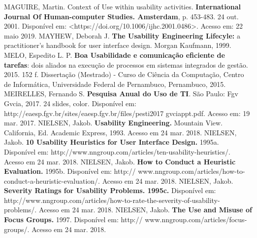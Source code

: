 \newline
\noindent
MAGUIRE, Martin. Context of Use within usability activities. \textbf{International Journal Of Human-computer Studies. Amsterdam}, p. 453-483. 24 out. 2001. Disponível em: <https://doi.org/10.1006/ijhc.2001.0486>. Acesso em: 22 maio 2019.
\newline
\newline
\noindent
MAYHEW, Deborah J. \textbf{The Usability Engineering Lifecyle:} a practitioner's handbook for user interface design. Morgan Kaufmann, 1999.
\newline
\newline
\noindent
MELO, Espedito L. P. \textbf{Boa Usabilidade e comunicação eficiente de tarefas}: dois aliados na execução de processos em sistemas integrados de gestão. 2015. 152 f. Dissertação (Mestrado) - Curso de Ciência da Computação, Centro de Informática, Universidade Federal de Pernambuco, Pernambuco, 2015.
\newline
\newline
\noindent
MEIRELLES, Fernando S. \textbf{Pesquisa Anual do Uso de TI}. São Paulo: Fgv Gvcia, 2017. 24 slides, color. Disponível em: http://eaesp.fgv.br/sites/eaesp.fgv.br/files/pesti2017
gvciappt.pdf. Acesso em: 19 mar. 2017.
\newline
\newline
\noindent
NIELSEN, Jakob.  \textbf{Usability Engineering.} Mountain View. California, Ed. Academic Express, 1993. Acesso em 24 mar. 2018.
\newline
\newline
\noindent
NIELSEN, Jakob.  \textbf{10 Usability Heuristics for User Interface Design.} 1995a. Disponível em: http://www.nngroup.com/articles/ten-usability-heuristics/. Acesso em 24 mar. 2018.
\newline
\newline
\noindent
NIELSEN, Jakob.  \textbf{How to Conduct a Heuristic Evaluation.} 1995b. Disponível em: http:// www.nngroup.com/articles/how-to-conduct-a-heuristic-evaluation/. Acesso em 24 mar. 2018.
\newline
\newline
\noindent
NIELSEN, Jakob.  \textbf{Severity Ratings for Usability Problems. 1995c.} Disponível em: http://www.nngroup.com/articles/how-to-rate-the-severity-of-usability-problems/. \newline Acesso em 24 mar. 2018.
\newline
\newline
\noindent
NIELSEN, Jakob.  \textbf{The Use and Misuse of Focus Groups.} 1997. Disponível em: http:// www.nngroup.com/articles/focus-groups/. Acesso em 24 mar. 2018.
